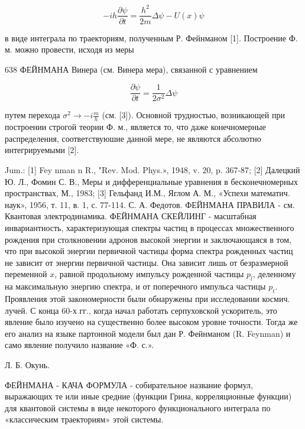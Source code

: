 \documentclass[10pt]{article}
\begin{document}
\[

-i h \frac{\partial \psi}{\partial t}=\frac{h^{2}}{2 m} \Delta \psi-U(x) \psi

\]



в виде интеграла по траекториям, полученным Р. Фейнманом [1]. Построение Ф. м. можно провести, исходя из меры



638 ФЕЙНМАНА Винера (см. Винера мера), связанной с уравнением



\[

\frac{\partial \psi}{\partial t}=\frac{1}{2 \sigma^{2}} \Delta \psi

\]



путем перехода $\sigma^{2} \rightarrow-i \frac{m}{h}$ (см. [3]). Основной трудностью, возникающей при построении строгой теории Ф. м., является то, что даже конечномерные распределения, соответствуюшие данной мере, не являются абсолютно интегрируемыми [2].



Jum.: [1] Fey nman n R., "Rev. Mod. Phys.», 1948, v. 20, p. 367-87; [2] Далецкий Ю. Л., Фомин С. В., Меры и дифференциальные уравнения в бесконечномерных пространствах, М., 1983; [3] Гельфанд И.М., Яглом А. М., «Успехи математич. наук», 1956, т. 11, в. 1, с. 77-114. С. А. Федотов. ФЕЙНМАНА ПРАВИЛА - см. Квантовая электродинамика. ФЕЙНМАНА СКЕЙЛИНГ - масштабная инвариантность, характеризующая спектры частиц в процессах множественного рождения при столкновении адронов высокой энергии и заключающаяся в том, что при высокой энергии первичной частицы форма спектра рожденных частиц не зависит от энергии первичной частицы. Она зависит лишь от безразмерной переменной $x$, равной продольному импульсу рожденной частицы $p_{l}$, деленному на максимальную энергию спектра, и от поперечного импульса частицы $p_{t}$. Проявления этой закономерности были обнаружены при исследовании космич. лучей. С конца 60-х гг., когда начал работать серпуховской ускоритель, это явление было изучено на существенно более высоком уровне точности. Тогда же его анализ на языке партонной модели был дан Р. Фейнманом (R. Feynman) и само явление получило название «Ф. с.».



Л. Б. Окунь.



ФЕЙНМАНА - КАЧА ФОРМУЛА - собирательное название формул, выражающих те или иные средние (функции Грина, корреляционные функции) для квантовой системы в виде некоторого функционального интеграла по «классическим траекториям» этой системы.
\end{document}
